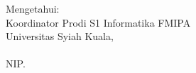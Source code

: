 \begin{center}
\begin{doublespace}
        Mengetahui:\\
        Koordinator Prodi S1 Informatika FMIPA\\
        Universitas Syiah Kuala,\\
        \vspace{4em}
        \underline{\kaprodi}\\
        NIP. \kaprodinip
    \end{doublespace}

\end{center}
